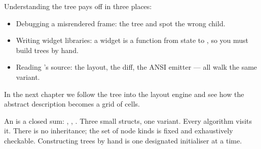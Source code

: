 Understanding the tree pays off in three places:

\begin{itemize}[leftmargin=*]
  \item Debugging a misrendered frame:  the tree and
    spot the wrong child.
  \item Writing widget libraries: a widget is a function from
    state to , so you must build trees by hand.
  \item Reading \maya{}'s source: the layout, the diff, the
    ANSI emitter --- all walk the same variant.
\end{itemize}

In the next chapter we follow the tree into the layout engine
and see how the abstract description becomes a grid of cells.

\begin{recap}
An  is a closed sum: ,
, . Three small structs, one
variant. Every \maya{} algorithm visits it. There is no
inheritance; the set of node kinds is fixed and exhaustively
checkable. Constructing trees by hand is one designated
initialiser at a time.
\end{recap}
